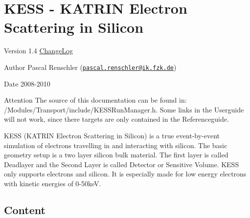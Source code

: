 


\hypertarget{KESSMain}{}\section{KESS -\/ KATRIN Electron Scattering in Silicon}\label{KESSMain}
\begin{DoxyVersion}{Version}
1.4 \hyperlink{_k_e_s_s_changelog}{ChangeLog} 
\end{DoxyVersion}
\begin{DoxyAuthor}{Author}
Pascal Renschler (\href{mailto:pascal.renschler@ik.fzk.de}{\tt pascal.renschler@ik.fzk.de}) 
\end{DoxyAuthor}
\begin{DoxyDate}{Date}
2008-\/2010 
\end{DoxyDate}
\begin{DoxyAttention}{Attention}
The source of this documentation can be found in: /Modules/Transport/include/KESSRunManager.h. Some links in the Userguide will not work, since there targets are only contained in the Referenceguide.
\end{DoxyAttention}


 KESS (KATRIN Electron Scattering in Silicon) is a true event-\/by-\/event simulation of electrons travelling in and interacting with silicon. The basic geometry setup is a two layer silicon bulk material. The first layer is called Deadlayer and the Second Layer is called Detector or Sensitive Volume. KESS only supports electrons and silicon. It is especially made for low energy electrons with kinetic energies of 0-\/50keV. 

\hypertarget{_k_e_s_s_main_KESSContent}{}\subsection{Content}\label{_k_e_s_s_main_KESSContent}

